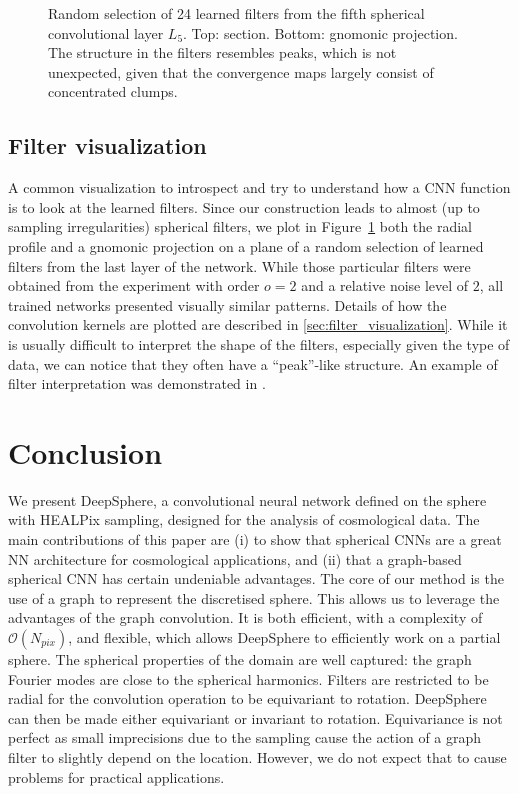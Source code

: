 \documentclass[final,twocolumn,3p,times,sort&compress]{elsarticle}
\newcommand{\figref}[1]{Figure~\ref{fig:#1}}
\newcommand{\1}{\b{1}}              %
\newcommand{\0}{\b{0}}              %
\newcommand{\bO}{\mathcal{O}}
\begin{document}
\begin{figure}
	\caption{Random selection of 24 learned filters from the fifth spherical convolutional layer $L_5$. Top: section. Bottom: gnomonic projection.
	The structure in the filters resembles peaks, which is not unexpected, given that the convergence maps largely consist of concentrated clumps.}
	\label{fig:learned_filter}
\end{figure}

\subsection{Filter visualization}


A common visualization to introspect and try to understand how a CNN function is to look at the learned filters.
Since our construction leads to almost (up to sampling irregularities) spherical filters, we plot in \figref{learned_filter} both the radial profile and a gnomonic projection on a plane of a random selection of learned filters from the last layer of the network.
While those particular filters were obtained from the experiment with order $o=2$ and a relative noise level of $2$, all trained networks presented visually similar patterns.
Details of how the convolution kernels are plotted are described in \ref{sec:filter_visualization}.
While it is usually difficult to interpret the shape of the filters, especially given the type of data, we can notice that they often have a ``peak''-like structure.
An example of filter interpretation was demonstrated in \citep{Ribli2018learningfrom}.

\section{Conclusion}
\label{sec:conclusion}

We present DeepSphere, a convolutional neural network defined on the sphere with HEALPix sampling, designed for the analysis of cosmological data.
The main contributions of this paper are (i) to show that spherical CNNs are a great NN architecture for cosmological applications, and (ii) that a graph-based spherical CNN has certain undeniable advantages.
The core of our method is the use of a graph to represent the discretised sphere.
This allows us to leverage the advantages of the graph convolution.
It is both efficient, with a complexity of $\bO(N_{pix})$, and flexible, which allows DeepSphere to efficiently work on a partial sphere.
The spherical properties of the domain are well captured: the graph Fourier modes are close to the spherical harmonics.
Filters are restricted to be radial for the convolution operation to be equivariant to rotation.
DeepSphere can then be made either equivariant or invariant to rotation.
Equivariance is not perfect as small imprecisions due to the sampling cause the action of a graph filter to slightly depend on the location.
However, we do not expect that to cause problems for practical applications.
\end{document}
